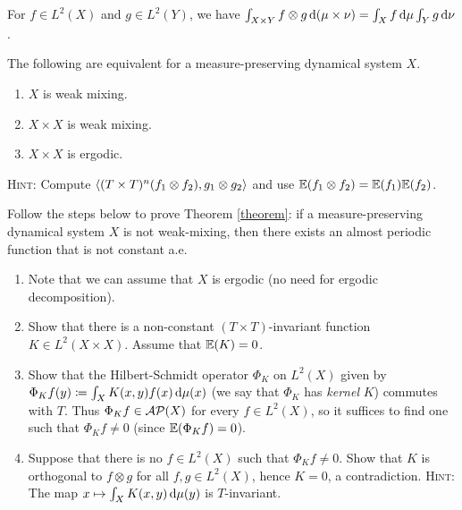 \documentclass[reqno, twoside]{article}
\begin{document}
    \begin{fact*}
        For $f\in L^2(X)$ and $g\in L^2(Y)$, we have $\int_{X\times Y}f\otimes g\,\mathrm{d}(\mu\times\nu)=\int_Xf\,\mathrm{d}\mu\int_Yg\,\mathrm{d}\nu$.
    \end{fact*}

    \begin{exercise}\label{equiv}
        The following are equivalent for a measure-preserving dynamical system $X$.
        \begin{enumerate}
            \item $X$ is weak mixing.
                \vspace{-0.05in}
            \item $X\times X$ is weak mixing.
                \vspace{-0.05in}
            \item $X\times X$ is ergodic.
        \end{enumerate}
        \textsc{Hint:} Compute $\left\langle(T\times T)^n(f_1\otimes f_2),g_1\otimes g_2\right\rangle$ and use $\mathbb{E}(f_1\otimes f_2)=\mathbb{E}(f_1)\mathbb{E}(f_2)$.
    \end{exercise}

    \begin{exercise}
        Follow the steps below to prove Theorem \ref{theorem}: if a measure-preserving dynamical system $X$ is not weak-mixing, then there exists an almost periodic function that is not constant a.e.
        \begin{enumerate}
            \item Note that we can assume that $X$ is ergodic (no need for ergodic decomposition).
                \vspace{-0.05in}
            \item Show that there is a non-constant $(T\times T)$-invariant function $K\in L^2(X\times X)$. Assume that $\mathbb{E}(K)=0$.
                \vspace{-0.2in}
            \item Show that the Hilbert-Schmidt operator $\Phi_K$ on $L^2(X)$ given by $\Phi_Kf(y)\coloneqq\int_XK(x,y)f(x)\,\mathrm{d}\mu(x)$ (we say that $\Phi_K$ has \textit{kernel} $K$) commutes with $T$. Thus $\Phi_Kf\in\mathcal{AP}(X)$ for every $f\in L^2(X)$, so it suffices to find one such that $\Phi_Kf\neq0$ (since $\mathbb{E}(\Phi_Kf)=0$).
                \vspace{-0.05in}
            \item Suppose that there is no $f\in L^2(X)$ such that $\Phi_Kf\neq0$. Show that $K$ is orthogonal to $f\otimes g$ for all $f,g\in L^2(X)$, hence $K=0$, a contradiction. \textsc{Hint}: The map $x\mapsto\int_XK(x,y)\,\mathrm{d}\mu(y)$ is $T$-invariant.
        \end{enumerate}
    \end{exercise}
\end{document}
